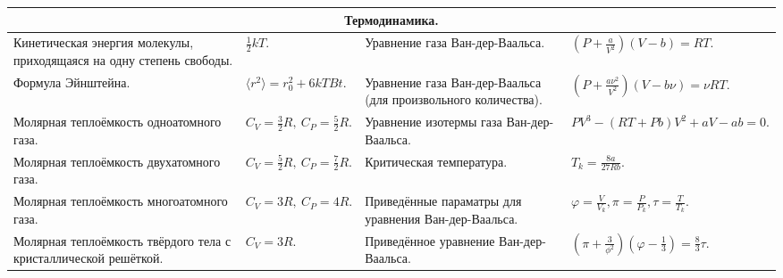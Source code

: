 \documentclass{article}
\begin{document}
\begin{tabular}{ |p{4.3cm}|p{5.2cm}|p{4.3cm}|p{5.2cm}|  }
\hline
\multicolumn{4}{|c|}{Термодинамика.} \\
\hline
Кинетическая энергия молекулы, приходящаяся на одну степень свободы.         &  %
$\frac{1}{2}kT.$                                                             &  %
Уравнение газа Ван-дер-Ваальса.                                              &  %
$\left( P + \frac{a}{V^2} \right) (V - b) = RT.$                             \\ %
\hline
Формула Эйнштейна.                                                           &  %
$\langle r^2 \rangle = r_0^2 + 6kTBt.$                                       &  %
Уравнение газа Ван-дер-Ваальса (для произвольного количества).               &  %
$\left( P + \frac{a \nu^2}{V^2} \right)( V - b \nu ) = \nu RT.$              \\ %
\hline
Молярная теплоёмкость одноатомного газа.                                     &  %
$C_V = \frac{3}{2}R, \: C_P = \frac{5}{2}R.$                                 &  %
Уравнение изотермы газа Ван-дер-Ваальса.                                     &  %
$PV^3 - (RT + Pb)V^2 + aV - ab = 0.$                                         \\ %
\hline
Молярная теплоёмкость двухатомного газа.                                     &  %
$C_V = \frac{5}{2}R, \: C_P = \frac{7}{2}R.$                                 &  %
Критическая температура.                                                     &  %
$T_k = \frac{8a}{27Rb}.$                                                     \\ %
\hline
Молярная теплоёмкость многоатомного газа.                                    &  %
$C_V = 3R, \: C_P = 4R.$                                                     &  %
Приведённые параматры для уравнения Ван-дер-Ваальса.                         &  %
$\varphi = \frac{V}{V_k}, \pi = \frac{P}{P_k}, \tau = \frac{T}{T_k}.$        \\ %
\hline
Молярная теплоёмкость твёрдого тела с кристаллической решёткой.              &  %
$C_V = 3R.$                                                                  &  %
Приведённое уравнение Ван-дер-Ваальса.                                       &  %
$
\left( \pi + \frac{3}{\phi^2} \right)\left( \varphi - \frac{1}{3} \right) = 
\frac{8}{3} \tau.
$                                                                            \\ %

\end{tabular}
\end{document}
